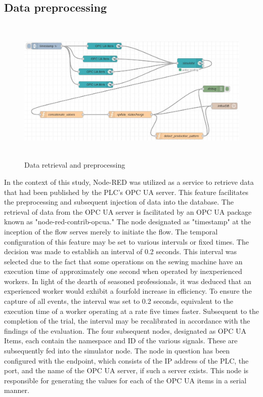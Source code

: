\subsection{Data preprocessing}
\begin{figure}[H]
	\centering
	\includegraphics[height=7cm]{pic/node-RED.jpg}
	\caption{Data retrieval and preprocessing}
	\label{fig:Model-Component-Pattern}
\end{figure}
In the context of this study, Node-RED was utilized as a service to retrieve data that had been published by the PLC's OPC UA server. This feature facilitates the preprocessing and subsequent injection of data into the database. The retrieval of data from the OPC UA server is facilitated by an OPC UA package known as "node-red-contrib-opcua." The node designated as "timestamp" at the inception of the flow serves merely to initiate the flow. The temporal configuration of this feature may be set to various intervals or fixed times. The decision was made to establish an interval of 0.2 seconds. This interval was selected due to the fact that some operations on the sewing machine have an execution time of approximately one second when operated by inexperienced workers. In light of the dearth of seasoned professionals, it was deduced that an experienced worker would exhibit a fourfold increase in efficiency. To ensure the capture of all events, the interval was set to 0.2 seconds, equivalent to the execution time of a worker operating at a rate five times faster. Subsequent to the completion of the trial, the interval may be recalibrated in accordance with the findings of the evaluation. The four subsequent nodes, designated as OPC UA Items, each contain the namespace and ID of the various signals. These are subsequently fed into the simulator node. The node in question has been configured with the endpoint, which consists of the IP address of the PLC, the port, and the name of the OPC UA server, if such a server exists. This node is responsible for generating the values for each of the OPC UA items in a serial manner.
